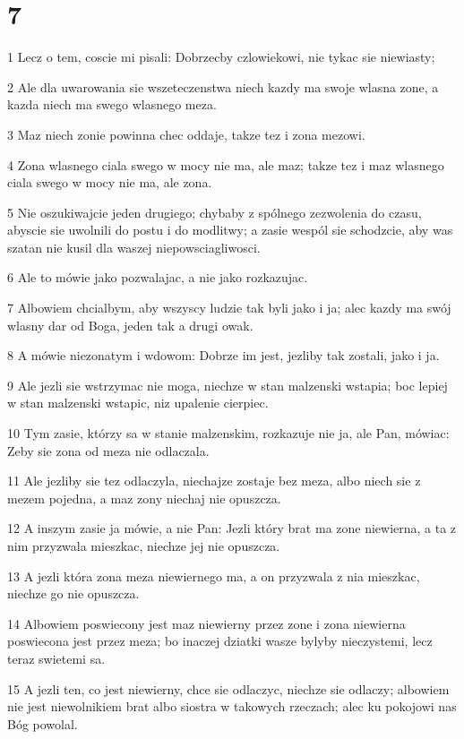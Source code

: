 \chapter{7}

\par 1 Lecz o tem, coscie mi pisali: Dobrzecby czlowiekowi, nie tykac sie niewiasty;
\par 2 Ale dla uwarowania sie wszeteczenstwa niech kazdy ma swoje wlasna zone, a kazda niech ma swego wlasnego meza.
\par 3 Maz niech zonie powinna chec oddaje, takze tez i zona mezowi.
\par 4 Zona wlasnego ciala swego w mocy nie ma, ale maz; takze tez i maz wlasnego ciala swego w mocy nie ma, ale zona.
\par 5 Nie oszukiwajcie jeden drugiego; chybaby z spólnego zezwolenia do czasu, abyscie sie uwolnili do postu i do modlitwy; a zasie wespól sie schodzcie, aby was szatan nie kusil dla waszej niepowsciagliwosci.
\par 6 Ale to mówie jako pozwalajac, a nie jako rozkazujac.
\par 7 Albowiem chcialbym, aby wszyscy ludzie tak byli jako i ja; alec kazdy ma swój wlasny dar od Boga, jeden tak a drugi owak.
\par 8 A mówie niezonatym i wdowom: Dobrze im jest, jezliby tak zostali, jako i ja.
\par 9 Ale jezli sie wstrzymac nie moga, niechze w stan malzenski wstapia; boc lepiej w stan malzenski wstapic, niz upalenie cierpiec.
\par 10 Tym zasie, którzy sa w stanie malzenskim, rozkazuje nie ja, ale Pan, mówiac: Zeby sie zona od meza nie odlaczala.
\par 11 Ale jezliby sie tez odlaczyla, niechajze zostaje bez meza, albo niech sie z mezem pojedna, a maz zony niechaj nie opuszcza.
\par 12 A inszym zasie ja mówie, a nie Pan: Jezli który brat ma zone niewierna, a ta z nim przyzwala mieszkac, niechze jej nie opuszcza.
\par 13 A jezli która zona meza niewiernego ma, a on przyzwala z nia mieszkac, niechze go nie opuszcza.
\par 14 Albowiem poswiecony jest maz niewierny przez zone i zona niewierna poswiecona jest przez meza; bo inaczej dziatki wasze bylyby nieczystemi, lecz teraz swietemi sa.
\par 15 A jezli ten, co jest niewierny, chce sie odlaczyc, niechze sie odlaczy; albowiem nie jest niewolnikiem brat albo siostra w takowych rzeczach; alec ku pokojowi nas Bóg powolal.
